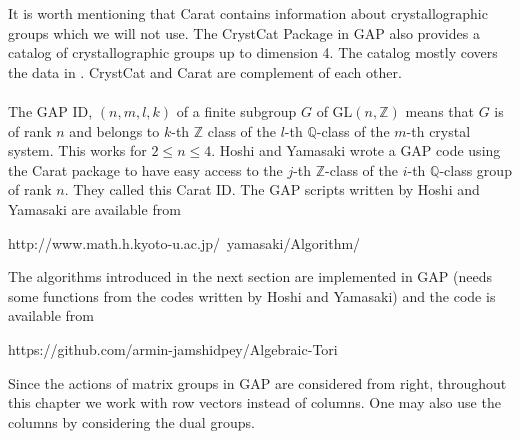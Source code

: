\documentclass{article}
\theoremstyle{plain}
\theoremstyle{definition}
\newcommand{\Z}{\ensuremath{\mathbb{Z}}}
\newcommand{\Q}{\ensuremath{\mathbb{Q}}}
\begin{document}
\noindent
It is worth mentioning that Carat contains information about crystallographic groups which we will not use. The CrystCat Package in GAP also provides a catalog of crystallographic groups up to dimension 4. The catalog mostly covers the data in \cite{Crystallography}. CrystCat and Carat are complement of each other. \\
\\
The GAP ID, $(n,m,l,k)$ of a finite subgroup $G$ of $\mathrm{GL}(n,\Z)$ means that $G$ is of rank $n$ and belongs to $k$-th $\Z$ class of the $l$-th $\Q$-class of the $m$-th crystal system. This works for $2\leq n \leq 4$. Hoshi and Yamasaki wrote a GAP code using the Carat package to have easy access to the $j$-th $\Z$-class of the $i$-th $\Q$-class group of rank $n$. They called this Carat ID. The GAP scripts written by Hoshi and Yamasaki are available from
\begin{center}
http://www.math.h.kyoto-u.ac.jp/~yamasaki/Algorithm/
\end{center}
The algorithms introduced in the next section are implemented in GAP (needs some functions from the codes written by Hoshi and Yamasaki) and the code is available from
\begin{center}
https://github.com/armin-jamshidpey/Algebraic-Tori
\end{center}
Since the actions of matrix groups in GAP are considered from right, throughout this chapter we work with row vectors instead of columns. One may also use the columns by considering the dual groups.
\end{document}
